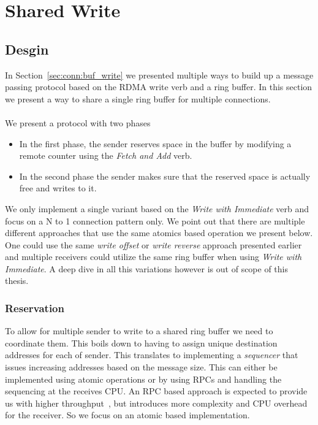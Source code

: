 \section{Shared Write} \label{sec:conn:shared_write}
\subsection{Desgin}
In Section~\ref{sec:conn:buf_write} we presented multiple ways to build up a message passing protocol based on the 
RDMA write verb and a ring buffer. In this section we present a way to share a single ring buffer for multiple connections.


\paragraph{} We present a protocol with two phases

\begin{itemize}
  \item In the first phase, the sender reserves space in the buffer by modifying a remote counter using 
    the \emph{Fetch and Add} verb.
  \item In the second phase the sender makes sure that the reserved space is actually free and writes to it.
\end{itemize}

We only implement a single variant based on the \emph{Write with Immediate} verb and focus on a N to 1 connection pattern only.
We point out that there are multiple different approaches that use the same atomics based operation we present below. One
could use the same \emph{write offset} or \emph{write reverse} approach presented earlier and multiple receivers could
utilize the same ring buffer when using \emph{Write with Immediate}. A deep dive in all this variations however is out
of scope of this thesis.

\subsubsection{Reservation}
To allow for multiple sender to write to a shared ring buffer we need to coordinate them. This boils down to having to
assign unique destination addresses for each of sender. This translates to implementing a \emph{sequencer} that issues
increasing addresses based on the message size. This can either be implemented using atomic operations or by using RPCs
and handling the sequencing at the receives CPU. An RPC based approach is expected to provide us with higher 
throughput~\cite{anuj-guide}, but introduces more complexity and CPU overhead for the receiver. So we focus on an atomic based 
implementation.


